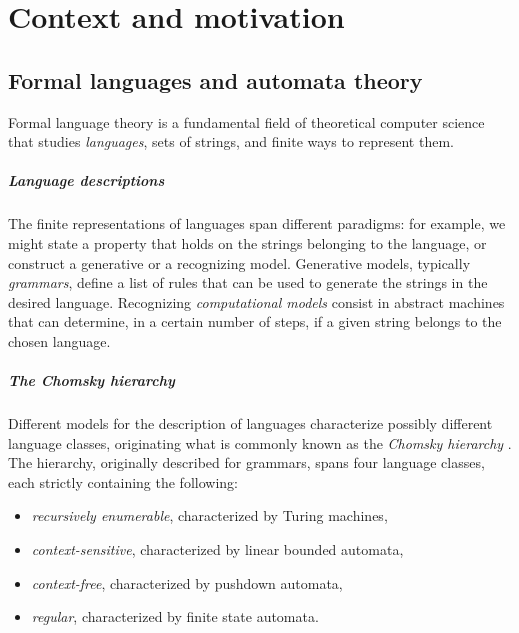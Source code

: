 \chapter{Context and motivation}\label{ch:context}



\section{Formal languages and automata theory}
Formal language theory is a fundamental field of theoretical computer science that studies \emph{languages}, \ie sets of strings, and finite ways to represent them.

\paragraph{Language descriptions} The finite representations of languages span different paradigms: for example, we might state a property that holds on the strings belonging to the language, or construct a generative or a recognizing model.
Generative models, typically \emph{grammars}, define a list of rules that can be used to generate the strings in the desired language.
Recognizing \emph{computational models} consist in abstract machines that can determine, in a certain number of steps, if a given string belongs to the chosen language.

\paragraph{The Chomsky hierarchy} Different models for the description of languages characterize possibly different language classes, originating what is commonly known as the \emph{Chomsky hierarchy} \cite{Cho56}.
The hierarchy, originally described for grammars, spans four language classes, each strictly containing the following:
\begin{itemize}
	\item \emph{recursively enumerable}, characterized by Turing machines,
	\item \emph{context-sensitive}, characterized by linear bounded automata,
	\item \emph{context-free}, characterized by pushdown automata,
	\item \emph{regular}, characterized by finite state automata.
\end{itemize}

